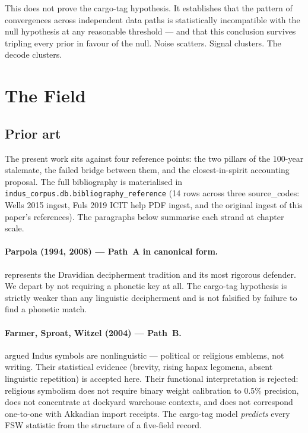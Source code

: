 \noindent
This does not prove the cargo-tag hypothesis.
It establishes that the pattern of convergences across independent
data paths is statistically incompatible with the null hypothesis
at any reasonable threshold --- and that this conclusion survives
tripling every prior in favour of the null.
Noise scatters. Signal clusters. The decode clusters.

\section{The Field}

\subsection{Prior art}

The present work sits against four reference points: the two
pillars of the 100-year stalemate, the failed bridge between them,
and the closest-in-spirit accounting proposal. The full bibliography
is materialised in
\texttt{indus\_corpus.db.bibliography\_reference} (14 rows across
three source\_codes: Wells 2015 ingest, Fuls 2019 ICIT help PDF
ingest, and the original ingest of this paper's references).
The paragraphs below summarise each strand at chapter scale.

\paragraph{Parpola (1994, 2008) --- Path~A in canonical form.}\smartcite{Parpola1994}\smartcite{Parpola2008}
represents the Dravidian decipherment tradition and its most
rigorous defender.
We depart by not requiring a phonetic key at all.
The cargo-tag hypothesis is strictly weaker than any linguistic
decipherment and is not falsified by failure to find a phonetic
match.

\paragraph{Farmer, Sproat, Witzel (2004) --- Path~B.}\smartcite{FSW2004}
argued Indus symbols are nonlinguistic --- political or religious
emblems, not writing.
Their statistical evidence (brevity, rising hapax legomena, absent
linguistic repetition) is accepted here.
Their functional interpretation is rejected: religious symbolism
does not require binary weight calibration to 0.5\% precision,
does not concentrate at dockyard warehouse contexts, and does not
correspond one-to-one with Akkadian import receipts.
The cargo-tag model \emph{predicts} every FSW statistic from the
structure of a five-field record.

